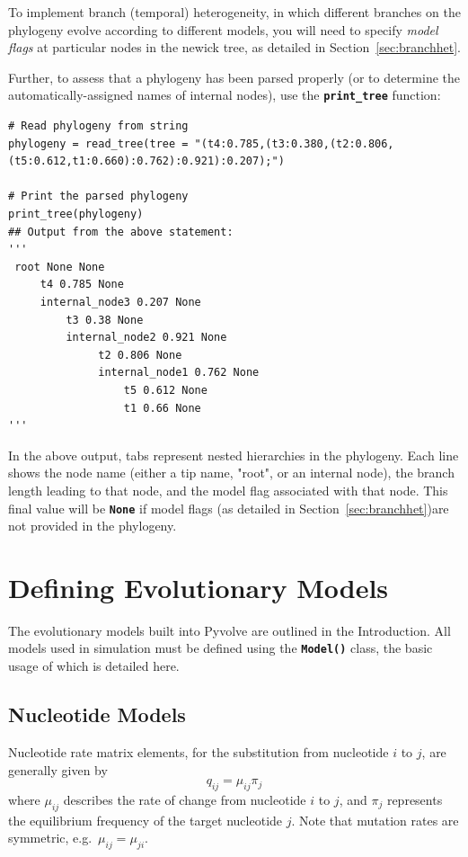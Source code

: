 \documentclass{article}
\newcommand{\code}[1]{\textbf{\texttt{\small{#1}}}}
\begin{document}
To implement branch (temporal) heterogeneity, in which different branches on the phylogeny evolve according to different models, you will need to specify \emph{model flags} at particular nodes in the newick tree, as detailed in Section~\ref{sec:branchhet}.

Further, to assess that a phylogeny has been parsed properly (or to determine the automatically-assigned names of internal nodes), use the \code{print\_tree} function:
\begin{lstlisting}
# Read phylogeny from string
phylogeny = read_tree(tree = "(t4:0.785,(t3:0.380,(t2:0.806,(t5:0.612,t1:0.660):0.762):0.921):0.207);")

# Print the parsed phylogeny
print_tree(phylogeny)
## Output from the above statement:
'''
 root None None
     t4 0.785 None
     internal_node3 0.207 None
         t3 0.38 None
         internal_node2 0.921 None
              t2 0.806 None
              internal_node1 0.762 None
                  t5 0.612 None
                  t1 0.66 None
'''
\end{lstlisting}
In the above output, tabs represent nested hierarchies in the phylogeny. Each line shows the node name (either a tip name, "root", or an internal node), the branch length leading to that node, and the model flag associated with that node. This final value will be \code{None} if model flags (as detailed in Section~\ref{sec:branchhet})are not provided in the phylogeny.



\section{Defining Evolutionary Models}\label{sec:evomodels}

The evolutionary models built into Pyvolve are outlined in the Introduction. All models used in simulation must be defined using the \code{Model()} class, the basic usage of which is detailed here.

\subsection{Nucleotide Models}\label{sec:nucleotide_basic}

Nucleotide rate matrix elements, for the substitution from nucleotide $i$ to $j$, are generally given by 
\begin{equation}
q_{ij} = \mu_{ij} \pi_j
\end{equation}
where $\mu_{ij}$ describes the rate of change from nucleotide $i$ to $j$, and $\pi_j$ represents the equilibrium frequency of the target nucleotide $j$. Note that mutation rates are symmetric, e.g.\ $\mu_{ij} = \mu_{ji}$. 
\end{document}
